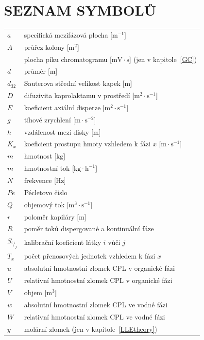 \documentclass[a4paper, 12pt]{article}
\begin{document}
\newpage \section*{SEZNAM SYMBOLŮ}
\singlespacing
\begin{tabular}{ll}
	$a$ & specifická mezifázová plocha [$\mathrm{m^{-1}}$] \\
	$A$ & průřez kolony [$\mathrm{m^2}$] \\
	& plocha píku chromatogramu [$\mathrm{mV \cdot s}$] (jen v kapitole~\ref{GC}) \\
	$d$ & průměr [m] \\
	$d_{32}$ & Sauterova střední velikost kapek [m] \\
	$D$ & difuzivita kaprolaktamu v prostředí [$\mathrm{m^2 \cdot s^{-1}}$] \\
	$E$ & koeficient axiální disperze [$\mathrm{m^2 \cdot s^{-1}}$] \\
	$g$ & tíhové zrychlení [$\mathrm{m \cdot s^{-2}}$] \\
	$h$ & vzdálenost mezi disky [m] \\
	$K_x$ & koeficient prostupu hmoty vzhledem k fázi $x$ [$\mathrm{m \cdot s^{-1}}$] \\
	$m$ & hmotnost [$\mathrm{kg}$] \\
	$\dot{m}$ & hmotnostní tok [$\mathrm{kg \cdot h^{-1}}$] \\
	$N$ & frekvence [Hz] \\
	$Pe$ & Pécletovo číslo \\
	$Q$ & objemový tok [$\mathrm{m^3 \cdot s^{-1}}$] \\
	$r$ & poloměr kapiláry [$\mathrm{m}$] \\
	$R$ & poměr toků dispergované a kontinuální fáze \\
	$S_{^i/_j}$ & kalibrační koeficient látky $i$ vůči $j$ \\
	$T_x$ & počet přenosových jednotek vzhledem k fázi $x$ \\
	$u$ & absolutní hmotnostní zlomek CPL v organické fázi \\
	$U$ & relativní hmotnostní zlomek CPL v organické fázi \\
	$V$ & objem [$\mathrm{m^3}$] \\
	$w$ & absolutní hmotnostní zlomek CPL ve vodné fázi \\
	$W$ & relativní hmotnostní zlomek CPL ve vodné fázi \\
	$y$ & molární zlomek (jen v kapitole~\ref{LLEtheory}) \\

\end{tabular}
\end{document}
